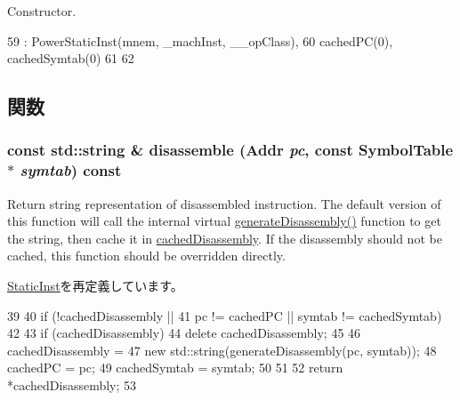 Constructor. 


\begin{DoxyCode}
59         : PowerStaticInst(mnem, _machInst, __opClass),
60           cachedPC(0), cachedSymtab(0)
61     {
62     }
\end{DoxyCode}


\subsection{関数}
\hypertarget{classPowerISA_1_1PCDependentDisassembly_a8b5fcb5ee981f062dfbdd09d676922f6}{
\subsubsection[{disassemble}]{\setlength{\rightskip}{0pt plus 5cm}const std::string \& disassemble ({\bf Addr} {\em pc}, \/  const SymbolTable $\ast$ {\em symtab}) const}}
\label{classPowerISA_1_1PCDependentDisassembly_a8b5fcb5ee981f062dfbdd09d676922f6}
Return string representation of disassembled instruction. The default version of this function will call the internal virtual \hyperlink{classPowerISA_1_1PowerStaticInst_a95d323a22a5f07e14d6b4c9385a91896}{generateDisassembly()} function to get the string, then cache it in \hyperlink{classStaticInst_aca407a93c3360ff06d5d52f92583a6e1}{cachedDisassembly}. If the disassembly should not be cached, this function should be overridden directly. 

\hyperlink{classStaticInst_acce45da56f8154aec68848514c4f819f}{StaticInst}を再定義しています。


\begin{DoxyCode}
39 {
40     if (!cachedDisassembly ||
41         pc != cachedPC || symtab != cachedSymtab)
42     {
43         if (cachedDisassembly)
44             delete cachedDisassembly;
45 
46         cachedDisassembly =
47             new std::string(generateDisassembly(pc, symtab));
48         cachedPC = pc;
49         cachedSymtab = symtab;
50     }
51 
52     return *cachedDisassembly;
53 }
\end{DoxyCode}


